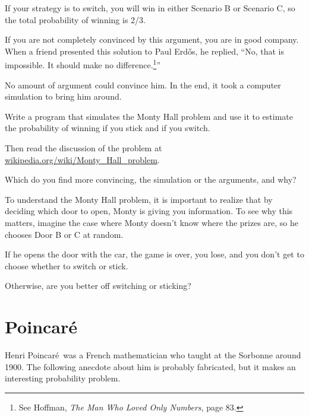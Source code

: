 \documentclass[12pt]{book}
\begin{document}
If your strategy is to switch, you will win in either Scenario
B or Scenario C, so the total probability of winning is 2/3.

\newcommand{\Erdos}{Erd\H{o}s}

\index{\Erdos, Paul}

If you are not completely convinced by this argument, you are
in good company.  When a friend presented this solution to
Paul \Erdos, he replied, ``No, that is impossible.  It should
make no difference.\footnote{See Hoffman, {\em The Man Who Loved
Only Numbers}, page 83.}''

No amount of argument could convince him.  In the end, it took
a computer simulation to bring him around.

\begin{ex}

Write a program that simulates the Monty Hall problem and use
it to estimate the probability of winning if you stick and if
you switch.

Then read the discussion of the problem at
\url{wikipedia.org/wiki/Monty_Hall_problem}.

Which do you find more convincing, the simulation or the arguments,
and why?

\end{ex}


\begin{ex}


To understand the Monty Hall problem, it is important to realize
that by deciding which door to open, Monty is giving you information.
To see why this matters, imagine the case where Monty doesn't
know where the prizes are, so he chooses Door B or C at random.

If he opens the door with the car, the game is over, you lose, and
you don't get to choose whether to switch or stick.

Otherwise, are you better off switching or sticking?

\end{ex}



\newcommand{\Poincare}{Poincar\'{e}}

\section{\Poincare}
\index{\Poincare, Henry}

Henri \Poincare~was a French mathematician who taught at the Sorbonne
around 1900.  The following anecdote about him is probably fabricated,
but it makes an interesting probability problem.
\end{document}
